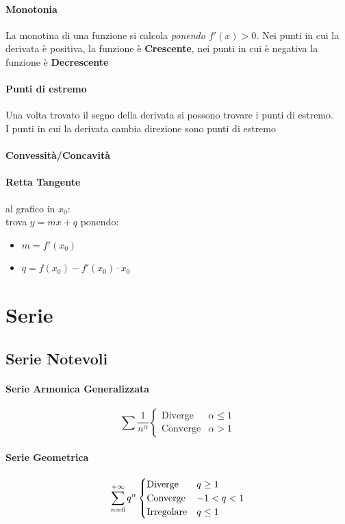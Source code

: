 \documentclass[12pt, a4paper]{article}
\begin{document}
\paragraph*{Monotonia}
La monotina di una funzione si calcola \emph{ponendo $f'(x)>0$.}
Nei punti in cui la derivata è positiva, la funzione è \textbf{Crescente}, nei punti in cui è negativa la funzione è \textbf{Decrescente}
\paragraph*{Punti di estremo}
Una volta trovato il segno della derivata si possono trovare i punti di estremo.
\\I punti in cui la derivata cambia direzione sono punti di estremo
\paragraph*{Convessità/Concavità}


\paragraph*{Retta Tangente} al grafico in $x_0$:\\
trova $y=mx + q$ ponendo:
\begin{itemize}
	\item $m=f'(x_0)$
	\item $q=f(x_0)-f'(x_0)\cdot x_0$
\end{itemize}


\section*{Serie}
\subsection*{Serie Notevoli}
\paragraph*{Serie Armonica Generalizzata}
\begin{equation*}
	\sum \frac{1}{n^\alpha} \begin{cases}
		\text{Diverge}  & \alpha\leq 1 \\
		\text{Converge} & \alpha> 1
	\end{cases}
\end{equation*}
\paragraph*{Serie Geometrica}
\begin{equation*}
	\sum_{n=0}^{+\infty} q^n \begin{cases}
		\text{Diverge}    & q\geq 1 \\
		\text{Converge}   & -1<q<1  \\
		\text{Irregolare} & q\leq 1
	\end{cases}
\end{equation*}
\end{document}
